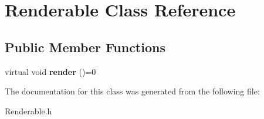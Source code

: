 \hypertarget{classRenderable}{}\section{Renderable Class Reference}
\label{classRenderable}
\subsection*{Public Member Functions}
\begin{DoxyCompactItemize}
\item 
\mbox{\label{classRenderable_a7d02709d871bd2bde97d41d933df5adf}} 
virtual void {\bfseries render} ()=0
\end{DoxyCompactItemize}


The documentation for this class was generated from the following file\+:\begin{DoxyCompactItemize}
\item 
Renderable.\+h\end{DoxyCompactItemize}
